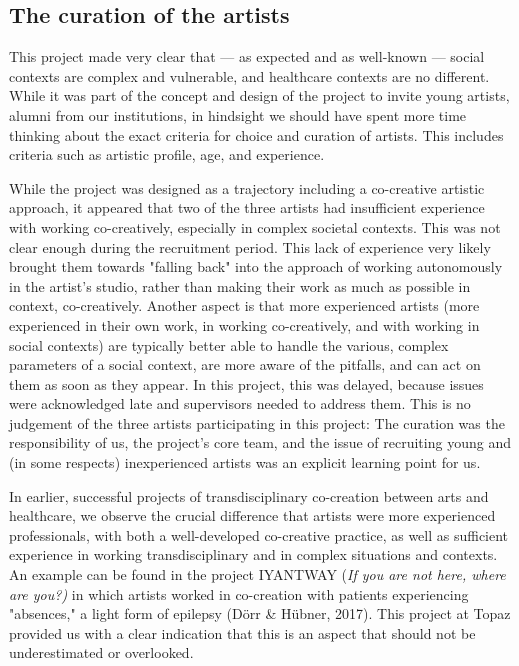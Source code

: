 \documentclass[authordate, empirical]{jote-new-article}
\begin{document}
	\subsection{The curation of the artists}



	This project made very clear that --- as expected and as well-known --- social contexts are complex and vulnerable, and healthcare contexts are no different. While it was part of the concept and design of the project to invite young artists, alumni from our institutions, in hindsight we should have spent more time thinking about the exact criteria for choice and curation of artists. This includes criteria such as artistic profile, age, and experience.



	While the project was designed as a trajectory including a co-creative artistic approach, it appeared that two of the three artists had insufficient experience with working co-creatively, especially in complex societal contexts. This was not clear enough during the recruitment period. This lack of experience very likely brought them towards "falling back" into the approach of working autonomously in the artist's studio, rather than making their work as much as possible in context, co-creatively. Another aspect is that more experienced artists (more experienced in their own work, in working co-creatively, and with working in social contexts) are typically better able to handle the various, complex parameters of a social context, are more aware of the pitfalls, and can act on them as soon as they appear. In this project, this was delayed, because issues were acknowledged late and supervisors needed to address them. This is no judgement of the three artists participating in this project: The curation was the responsibility of us, the project's core team, and the issue of recruiting young and (in some respects) inexperienced artists was an explicit learning point for us.



	In earlier, successful projects of transdisciplinary co-creation between arts and healthcare, we observe the crucial difference that artists were more experienced professionals, with both a well-developed co-creative practice, as well as sufficient experience in working transdisciplinary and in complex situations and contexts. An example can be found in the project IYANTWAY (\emph{If you are not here, where are you?) }in which artists worked in co-creation with patients experiencing "absences," a light form of epilepsy (Dörr \& Hübner, 2017). This project at Topaz provided us with a clear indication that this is an aspect that should not be underestimated or overlooked.
\end{document}
